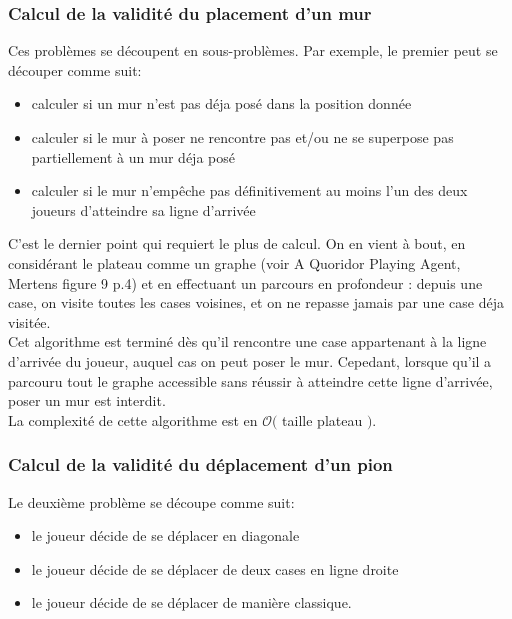 \documentclass[12pt,a4paper]{article}
\begin{document}
\subsubsection{Calcul de la validité du placement d'un mur}

Ces problèmes se découpent en sous-problèmes. Par exemple, le premier 
peut se découper comme suit:
\begin{itemize}
  \item calculer si un mur n'est pas déja posé dans la position donnée
  \item calculer si le mur à poser ne rencontre pas et/ou ne se superpose pas 
partiellement à un mur déja posé
  \item calculer si le mur n'emp\^eche pas définitivement au moins l'un des deux 
joueurs d'atteindre sa ligne d'arrivée \\
\end{itemize}

C'est le dernier point qui requiert le plus de calcul. On en vient à bout, en 
considérant le plateau comme un graphe (voir A Quoridor Playing Agent, Mertens 
figure 9 p.4) et en effectuant un parcours en profondeur :
depuis une case, on visite toutes les cases voisines, et on ne repasse jamais par une 
case déja visitée.\\

Cet algorithme est terminé dès qu'il rencontre une case appartenant à la ligne 
d'arrivée du joueur, auquel cas on peut poser le mur. Cepedant, lorsque qu'il a 
parcouru tout le graphe accessible sans réussir à atteindre cette ligne 
d'arrivée, poser un mur est interdit.\\

La complexité de cette algorithme est en $\mathcal{O}($ \text taille plateau 
$)$.

\subsubsection{Calcul de la validité du déplacement d'un pion}

Le deuxième problème se découpe comme suit:
\begin{itemize}
  \item le joueur décide de se déplacer en diagonale
  \item le joueur décide de se déplacer de deux cases en ligne droite
  \item le joueur décide de se déplacer de manière classique. \\
\end{itemize}
\end{document}
